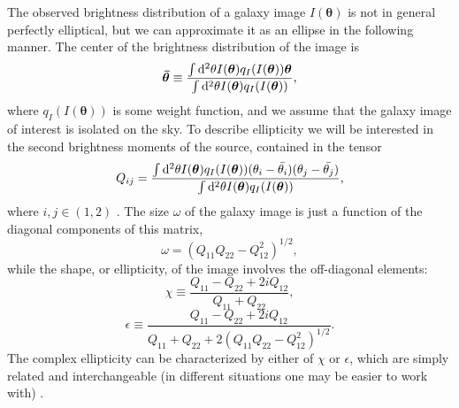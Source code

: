 The observed brightness distribution of a galaxy image $I(\bm{\theta})$ is not in general perfectly elliptical, but we can approximate it as an ellipse in the following manner. The center of the brightness distribution of the image is
\begin{equation}
\bm{\bar{\theta}} \equiv \frac{\int {\rm d}^2\theta I(\bm{\theta}) q_I( I(\bm{\theta})) \bm{\theta}}{\int {\rm d}^2\theta I(\bm{\theta}) q_I( I(\bm{\theta}))},
\end{equation}
where $q_I( I(\bm{\theta}))$ is some weight function, and we assume that the galaxy image of interest is isolated on the sky. To describe ellipticity we will be interested in the second brightness moments of the source, contained in the tensor
\begin{equation}
Q_{ij} = \frac{\int {\rm d}^2\theta I(\bm{\theta}) q_I( I(\bm{\theta})) (\theta_i - \bar{\theta_i})(\theta_j - \bar{\theta_j})}{\int {\rm d}^2\theta I(\bm{\theta}) q_I( I(\bm{\theta}))},
\end{equation}
where $i,j \in (1,2)$ \citep{Schneider06_WeakGravLens}. The size $\omega$ of the galaxy image is just a function of the diagonal components of this matrix,
\begin{equation} 
\label{eqn:size}
\omega = (Q_{11}Q_{22} - Q_{12}^2)^{1/2},
\end{equation}
while the shape, or ellipticity, of the image involves the off-diagonal elements:
\begin{equation} 
\chi \equiv \frac{Q_{11} - Q_{22} + 2i Q_{12}}{Q_{11} + Q_{22}} ,
\end{equation}
\begin{equation} 
\epsilon \equiv \frac{Q_{11} - Q_{22} + 2i Q_{12}}{Q_{11} + Q_{22} + 2(Q_{11}Q_{22} - Q_{12}^2)^{1/2}}.
\end{equation}
The complex ellipticity can be characterized by either of $\chi$ or $\epsilon$, which are simply related and interchangeable (in different situations one may be easier to work with) \citep{BS01}. 

